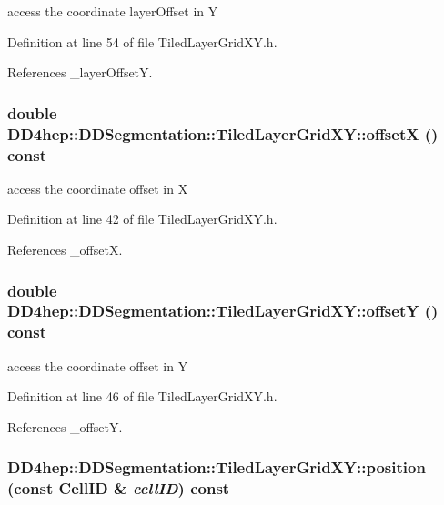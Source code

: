 access the coordinate layerOffset in Y 

Definition at line 54 of file TiledLayerGridXY.h.

References \_\-layerOffsetY.\hypertarget{class_d_d4hep_1_1_d_d_segmentation_1_1_tiled_layer_grid_x_y_a9e892950c0d0f6556a8a91b79ea72ee5}{
\subsubsection[{offsetX}]{\setlength{\rightskip}{0pt plus 5cm}double DD4hep::DDSegmentation::TiledLayerGridXY::offsetX () const}}
\label{class_d_d4hep_1_1_d_d_segmentation_1_1_tiled_layer_grid_x_y_a9e892950c0d0f6556a8a91b79ea72ee5}


access the coordinate offset in X 

Definition at line 42 of file TiledLayerGridXY.h.

References \_\-offsetX.\hypertarget{class_d_d4hep_1_1_d_d_segmentation_1_1_tiled_layer_grid_x_y_a9aebdc0d2b7e2ce60a075d733eaf6188}{
\subsubsection[{offsetY}]{\setlength{\rightskip}{0pt plus 5cm}double DD4hep::DDSegmentation::TiledLayerGridXY::offsetY () const}}
\label{class_d_d4hep_1_1_d_d_segmentation_1_1_tiled_layer_grid_x_y_a9aebdc0d2b7e2ce60a075d733eaf6188}


access the coordinate offset in Y 

Definition at line 46 of file TiledLayerGridXY.h.

References \_\-offsetY.\hypertarget{class_d_d4hep_1_1_d_d_segmentation_1_1_tiled_layer_grid_x_y_a1cf88ec570ea925ca8b324efae04ce04}{
\subsubsection[{position}]{ DD4hep::DDSegmentation::TiledLayerGridXY::position (const {\bf CellID} \& {\em cellID}) const}}
\label{class_d_d4hep_1_1_d_d_segmentation_1_1_tiled_layer_grid_x_y_a1cf88ec570ea925ca8b324efae04ce04}


